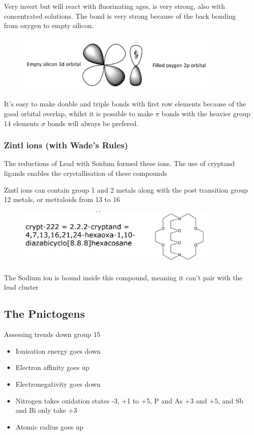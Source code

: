 \documentclass{article}
\begin{document}
    Very invert but will react with fluorinating ages,  is very strong, also with concentrated  solutions.
    The  bond is very strong because of the back bonding from oxygen to empty silicon.
    
    \begin{figure}[h]
        \centering
        \includegraphics[width=10cm]{backbon.jpg}
    \end{figure}

    It's easy to make double and triple bonds with first row elements because of the good orbital overlap, 
    whilst it is possible to make $\pi$ bonds with the heavier group 14 elements $\sigma$ bonds will always be prefered.

     \subsubsection{Zintl ions (with Wade's Rules)}

    The reductions of Lead with Soidum formed these ions. 
    The use of cryptand ligands enables the crystallisation of these compounds

    Zintl ions can contain group 1 and 2 metals along with the post transition group 12 metals, or mettaloids from 13 to 16

    \begin{figure}[h]
        \centering
        \includegraphics[width=10cm]{crypt.jpg}
    \end{figure}

    The Sodium ion is bound inside this compound, meaning it can't pair with the lead cluster

    \subsection{The Pnictogens}
    Assessing trends down group 15
    \begin{itemize}
        \item Ionisation energy goes down
        \item Electron affinity goes up
        \item Electronegativity goes down
        \item Nitrogen takes oxidation states -3, +1 to +5, P and As +3 and +5, and Sb and Bi only take +3
        \item Atomic radius goes up
    \end{itemize}
\end{document}
